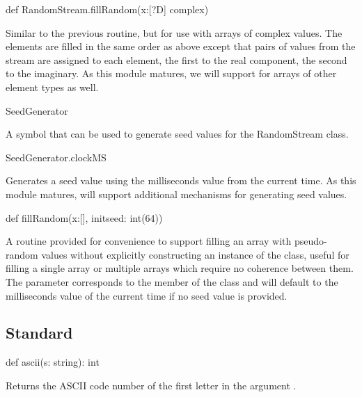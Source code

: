 \begin{protohead}
def RandomStream.fillRandom(x:[?D] complex)
\end{protohead}
\begin{protobody}
Similar to the previous routine, but for use with arrays of complex
values.  The elements are filled in the same order as above except
that pairs of values from the stream are assigned to each element, the
first to the real component, the second to the imaginary.  As this
module matures, we will support  for arrays of other
element types as well.
\end{protobody}

\begin{protohead}
SeedGenerator
\end{protohead}
\begin{protobody}
A symbol that can be used to generate seed values for the RandomStream
class.
\end{protobody}

\begin{protohead}
SeedGenerator.clockMS
\end{protohead}
\begin{protobody}
Generates a seed value using the milliseconds value from the current
time.  As this module matures,  will support
additional mechanisms for generating seed values.
\end{protobody}

\begin{protohead}
def fillRandom(x:[], initseed: int(64))
\end{protohead}
\begin{protobody}

A routine provided for convenience to support filling an array
 with pseudo-random values without explicitly constructing an
instance of the  class, useful for filling a single
array or multiple arrays which require no coherence between them.  The
 parameter corresponds to the  member of the
 class and will default to the milliseconds value
of the current time if no seed value is provided.
\end{protobody}

\subsection{Standard}
\label{Standard}

\begin{protohead}
def ascii(s: string): int
\end{protohead}
\begin{protobody}
Returns the ASCII code number of the first letter in the
argument .
\end{protobody}

